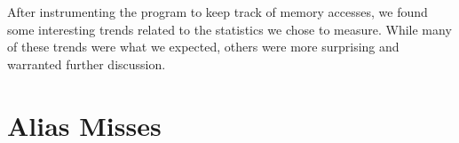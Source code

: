 After instrumenting the program to keep track of memory accesses, we found some interesting trends related to the statistics we chose to measure. While many of these trends were what we expected, others were more surprising and warranted further discussion.

\section{Alias Misses}
